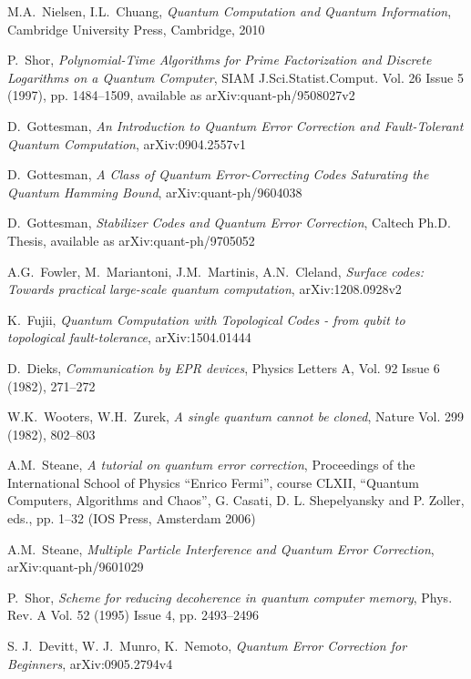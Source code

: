 \documentclass[a4paper, draft]{article}
\theoremstyle{own}
\theoremstyle{remark}
\begin{document}
\begin{thebibliography}{9}


M.A.~Nielsen, I.L.~Chuang, \emph{Quantum Computation and Quantum Information},
Cambridge University Press, Cambridge, 2010

P.~Shor, \emph{Polynomial-Time Algorithms for Prime Factorization and Discrete Logarithms on a Quantum Computer}, SIAM J.Sci.Statist.Comput. Vol. 26 Issue 5 (1997), pp. 1484--1509, available as arXiv:quant-ph/9508027v2


D.~Gottesman, \emph{An Introduction to Quantum Error Correction and Fault-Tolerant Quantum Computation}, arXiv:0904.2557v1

D.~Gottesman, \emph{A Class of Quantum Error-Correcting Codes Saturating the Quantum Hamming Bound}, arXiv:quant-ph/9604038

D.~Gottesman, \emph{Stabilizer Codes and Quantum Error Correction}, Caltech Ph.D. Thesis, available as  arXiv:quant-ph/9705052

A.G.~Fowler, M.~Mariantoni, J.M.~Martinis, A.N.~Cleland, \emph{Surface codes: Towards practical large-scale quantum computation}, arXiv:1208.0928v2

K.~Fujii, \emph{Quantum Computation with Topological Codes - from qubit to topological fault-tolerance}, 	arXiv:1504.01444 

D.~Dieks, \emph{Communication by EPR devices}, Physics Letters A, Vol. 92 Issue 6 (1982), 271--272

W.K.~Wooters, W.H.~Zurek, \emph{A single quantum cannot be cloned}, Nature Vol. 299 (1982), 802--803

A.M.~Steane, \emph{A tutorial on quantum error correction}, Proceedings of the International School of Physics “Enrico Fermi”, course CLXII, “Quantum Computers,
Algorithms and Chaos”, G. Casati, D. L. Shepelyansky and P. Zoller, eds., pp. 1–32 (IOS Press, Amsterdam 2006)

A.M.~Steane, \emph{Multiple Particle Interference and Quantum Error Correction}, 	arXiv:quant-ph/9601029

P.~Shor, \emph{Scheme for reducing decoherence in quantum computer memory},
Phys. Rev. A Vol. 52 (1995) Issue 4, pp. 2493--2496 

S. J.~Devitt, W. J.~Munro, K.~Nemoto, \emph{Quantum Error Correction for Beginners},
arXiv:0905.2794v4


\end{thebibliography}
\end{document}

